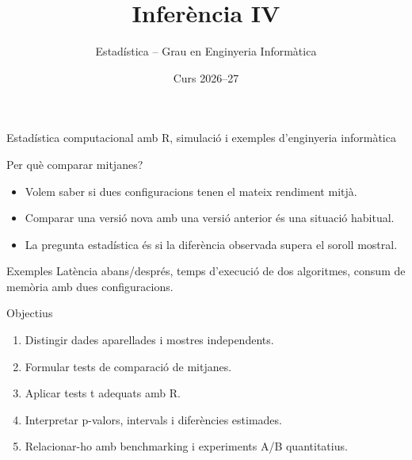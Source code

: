 \documentclass[10pt,aspectratio=169]{beamer}
\title[Inferència IV]{Inferència IV}
\author{Estadística -- Grau en Enginyeria Informàtica}
\date{Curs 2026--27}
\newcommand{\R}{\textsf{R}}
\begin{document}
\begin{frame}[plain]
  \titlepage
  \vspace{-0.45cm}
  \begin{center}
  \small\textcolor{DeepBlue}{Estadística computacional amb \R, simulació i exemples d'enginyeria informàtica}
  \end{center}
\end{frame}


\begin{frame}[fragile]{Per què comparar mitjanes?}
\begin{itemize}
  \item Volem saber si dues configuracions tenen el mateix rendiment mitjà.
  \item Comparar una versió nova amb una versió anterior és una situació habitual.
  \item La pregunta estadística és si la diferència observada supera el soroll mostral.
\end{itemize}
\begin{block}{Exemples}
Latència abans/després, temps d'execució de dos algoritmes, consum de memòria amb dues configuracions.
\end{block}
\end{frame}

\begin{frame}[fragile]{Objectius}
\begin{enumerate}
  \item Distingir dades aparellades i mostres independents.
  \item Formular tests de comparació de mitjanes.
  \item Aplicar tests t adequats amb \R.
  \item Interpretar p-valors, intervals i diferències estimades.
  \item Relacionar-ho amb benchmarking i experiments A/B quantitatius.
\end{enumerate}
\end{frame}
\end{document}
